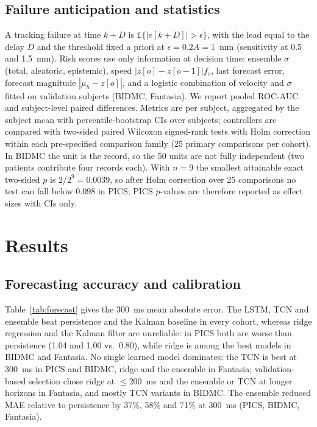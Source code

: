 \documentclass[conference]{IEEEtran}
\begin{document}
\subsection{Failure anticipation and statistics}
A tracking failure at time $k+D$ is $\mathbb{1}\{|e[k+D]|>\epsilon\}$, with the lead equal to the delay $D$ and the threshold fixed a priori at $\epsilon=0.2A=1$~mm (sensitivity at 0.5 and 1.5~mm). Risk scores use only information at decision time: ensemble $\sigma$ (total, aleatoric, epistemic), speed $|z[o]-z[o-1]|f_s$, last forecast error, forecast magnitude $|\mu_h-z[o]|$, and a logistic combination of velocity and $\sigma$ fitted on validation subjects (BIDMC, Fantasia). We report pooled ROC-AUC and subject-level paired differences. Metrics are per subject, aggregated by the subject mean with percentile-bootstrap CIs over subjects; controllers are compared with two-sided paired Wilcoxon signed-rank tests \cite{rWilcoxon} with Holm correction \cite{rHolm} within each pre-specified comparison family (25 primary comparisons per cohort). In BIDMC the unit is the record, so the 50 units are not fully independent (two patients contribute four records each). With $n=9$ the smallest attainable exact two-sided $p$ is $2/2^9=0.0039$, so after Holm correction over 25 comparisons no test can fall below $0.098$ in PICS; PICS $p$-values are therefore reported as effect sizes with CIs only.

\section{Results}
\subsection{Forecasting accuracy and calibration}
Table~\ref{tab:forecast} gives the 300~ms mean absolute error. The LSTM, TCN and ensemble beat persistence and the Kalman baseline in every cohort, whereas ridge regression and the Kalman filter are unreliable: in PICS both are worse than persistence (1.04 and 1.00 vs.\ 0.80), while ridge is among the best models in BIDMC and Fantasia. No single learned model dominates: the TCN is best at 300~ms in PICS and BIDMC, ridge and the ensemble in Fantasia; validation-based selection chose ridge at $\le$200~ms and the ensemble or TCN at longer horizons in Fantasia, and mostly TCN variants in BIDMC. The ensemble reduced MAE relative to persistence by 37\%, 58\% and 71\% at 300~ms (PICS, BIDMC, Fantasia).
\end{document}
